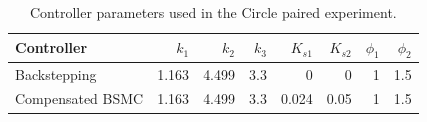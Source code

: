\begin{table}[!t]
\centering
\caption{Controller parameters used in the Circle paired experiment.}
\label{tab:controller_parameters}
\begin{tabular}{lrrrrrrr}
\hline
Controller & $k_1$ & $k_2$ & $k_3$ & $K_{s1}$ & $K_{s2}$ & $\phi_1$ & $\phi_2$ \\
\hline
Backstepping & 1.163 & 4.499 & 3.3 & 0 & 0 & 1 & 1.5 \\
Compensated BSMC & 1.163 & 4.499 & 3.3 & 0.024 & 0.05 & 1 & 1.5 \\
\hline
\end{tabular}
\end{table}
